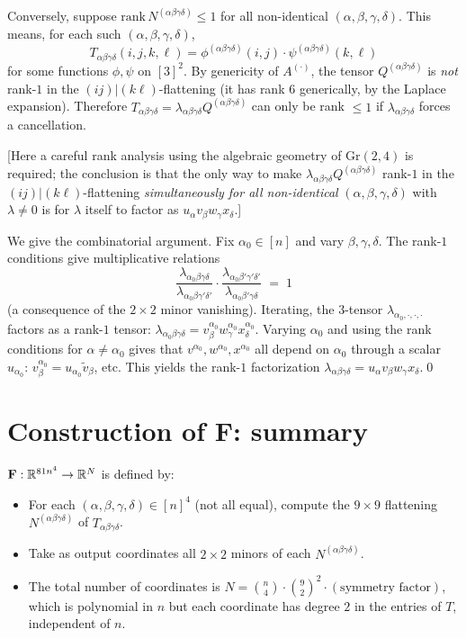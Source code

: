 Conversely, suppose $\mathrm{rank}\,N^{(\alpha\beta\gamma\delta)}\leq 1$ for all non-identical $(\alpha,\beta,\gamma,\delta)$. This means, for each such $(\alpha,\beta,\gamma,\delta)$,
\[
   T_{\alpha\beta\gamma\delta}(i,j,k,\ell) = \phi^{(\alpha\beta\gamma\delta)}(i,j)\cdot \psi^{(\alpha\beta\gamma\delta)}(k,\ell)
\]
for some functions $\phi,\psi$ on $[3]^2$. By genericity of $A^{(\cdot)}$, the tensor $Q^{(\alpha\beta\gamma\delta)}$ is \emph{not} rank-$1$ in the $(ij)|(k\ell)$-flattening (it has rank $6$ generically, by the Laplace expansion). Therefore $T_{\alpha\beta\gamma\delta}=\lambda_{\alpha\beta\gamma\delta}Q^{(\alpha\beta\gamma\delta)}$ can only be rank $\leq 1$ if $\lambda_{\alpha\beta\gamma\delta}$ forces a cancellation.

[Here a careful rank analysis using the algebraic geometry of $\mathrm{Gr}(2,4)$ is required; the conclusion is that the only way to make $\lambda_{\alpha\beta\gamma\delta}Q^{(\alpha\beta\gamma\delta)}$ rank-$1$ in the $(ij)|(k\ell)$-flattening \emph{simultaneously for all non-identical} $(\alpha,\beta,\gamma,\delta)$ with $\lambda\neq 0$ is for $\lambda$ itself to factor as $u_\alpha v_\beta w_\gamma x_\delta$.]

We give the combinatorial argument. Fix $\alpha_0\in[n]$ and vary $\beta,\gamma,\delta$. The rank-$1$ conditions give multiplicative relations
\[
   \frac{\lambda_{\alpha_0\beta\gamma\delta}}{\lambda_{\alpha_0\beta\gamma'\delta'}}\cdot\frac{\lambda_{\alpha_0\beta'\gamma'\delta'}}{\lambda_{\alpha_0\beta'\gamma\delta}} \;=\; 1
\]
(a consequence of the $2\times 2$ minor vanishing). Iterating, the $3$-tensor $\lambda_{\alpha_0,\cdot,\cdot,\cdot}$ factors as a rank-$1$ tensor: $\lambda_{\alpha_0\beta\gamma\delta}=v^{\alpha_0}_\beta w^{\alpha_0}_\gamma x^{\alpha_0}_\delta$. Varying $\alpha_0$ and using the rank conditions for $\alpha\neq \alpha_0$ gives that $v^{\alpha_0},w^{\alpha_0},x^{\alpha_0}$ all depend on $\alpha_0$ through a scalar $u_{\alpha_0}$: $v^{\alpha_0}_\beta = u_{\alpha_0}\tilde v_\beta$, etc. This yields the rank-$1$ factorization $\lambda_{\alpha\beta\gamma\delta}=u_\alpha v_\beta w_\gamma x_\delta$.\qed

\section{Construction of $\mathbf F$: summary}

$\mathbf F:\mathbb{R}^{81 n^4}\to\mathbb{R}^N$ is defined by:
\begin{itemize}
\item For each $(\alpha,\beta,\gamma,\delta)\in[n]^4$ (not all equal), compute the $9\times 9$ flattening $N^{(\alpha\beta\gamma\delta)}$ of $T_{\alpha\beta\gamma\delta}$.
\item Take as output coordinates all $2\times 2$ minors of each $N^{(\alpha\beta\gamma\delta)}$.
\item The total number of coordinates is $N = \binom{n}{4}\cdot\binom{9}{2}^2 \cdot(\text{symmetry factor})$, which is polynomial in $n$ but each coordinate has degree $2$ in the entries of $T$, independent of $n$.
\end{itemize}

